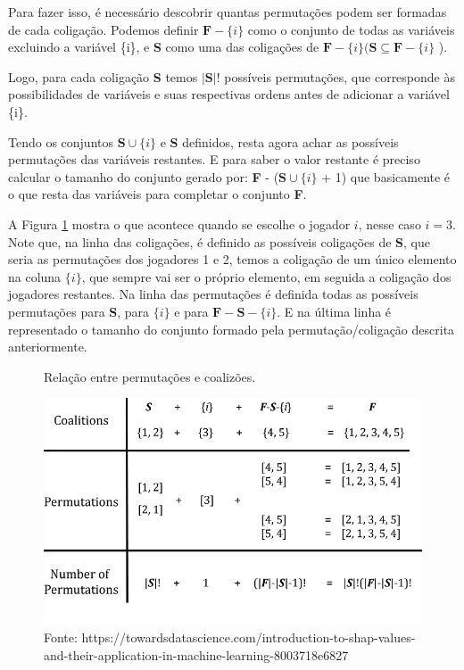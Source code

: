 Para fazer isso, é necessário descobrir quantas permutações podem ser formadas de cada coligação. Podemos definir $\textbf{F} - \{i\}$ como o conjunto de todas as variáveis excluindo a variável \{i\}, e \textbf{S} como uma das coligações de $\textbf{F} - \{i\} (\textbf{S} \subseteq  \textbf{F} - \{i\}$ ).

Logo, para cada coligação \textbf{S} temos $|\textbf{S}|!$ possíveis permutações, que corresponde às possibilidades  de variáveis e suas respectivas ordens antes de adicionar a variável \{i\}.

Tendo os conjuntos $\textbf{S}\cup\{i\}$ e \textbf{S} definidos, resta agora achar as possíveis permutações das variáveis restantes. E para saber o valor restante é preciso calcular o tamanho do conjunto gerado por: \textbf{F} - ($\textbf{S}\cup\{i\}$ + 1)
que basicamente é o que resta das variáveis para completar o conjunto \textbf{F}.

A Figura \ref{fig:permut_e_colig}  mostra o que acontece quando se escolhe o jogador $i$, nesse caso $i=3$. Note que, na linha das coligações, é definido as possíveis coligações de \textbf{S}, que seria as permutações dos jogadores 1 e 2, temos a coligação de um único elemento na coluna $\{i\}$, que sempre vai ser o próprio elemento, em seguida a coligação dos jogadores restantes. Na linha das permutações é definida todas as possíveis permutações para \textbf{S}, para $\{i\}$ e para $\textbf{F}-\textbf{S}-\{i\}$. E na última linha é representado o tamanho do conjunto formado pela permutação/coligação descrita anteriormente.

\begin{figure}[H]
    \centering
    \caption{Relação entre permutações e coalizões.}
    \includegraphics[scale=0.5]{imagens/shap1.png}
    \caption*{Fonte: https://towardsdatascience.com/introduction-to-shap-values-and-their-application-in-machine-learning-8003718e6827}
    \label{fig:permut_e_colig}
    
\end{figure}

